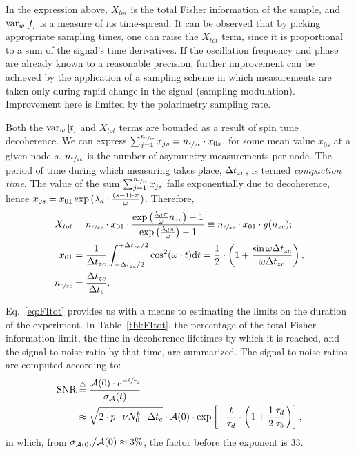 \documentclass{jacow}
\begin{document}
In the expression above, $X_{tot}$ is the total Fisher information of the sample, and $\var[w]{t}$ is a measure of its time-spread. It can be observed that by picking appropriate sampling times, one can raise the $X_{tot}$ term, since it is proportional to a sum of the signal's time derivatives. If the oscillation frequency and phase are already known to a reasonable precision, further improvement can be achieved by the application of a sampling scheme in which measurements are taken only during rapid change in the signal (sampling modulation). Improvement here is limited by the polarimetry sampling rate.

Both the $\var[w]{t}$ and $X_{tot}$ terms are bounded as a result of spin tune decoherence. We can express $\sum_{j=1}^{{n_{\sfrac{\epsilon}{zc}}}} x_{js} = {n_{\sfrac{\epsilon}{zc}}} \cdot x_{0s}$, for some mean value $x_{0s}$ at a given node $s$. ${n_{\sfrac{\epsilon}{zc}}}$ is the number of asymmetry measurements per node. The period of time during which measuring takes place, $\Delta t_{zc}$, is termed \textit{compaction time}. The value of the sum $\sum_{j=1}^{{n_{\sfrac{\epsilon}{zc}}}} x_{js}$ falls exponentially due to decoherence, hence $x_{0s} = x_{01}\exp{(\lambda_d\cdot \frac{(s-1)\cdot\pi}{\omega})}$. Therefore,
\begin{align}
	X_{tot} & = \Nmnd\cdot x_{01} \cdot \frac{\exp{\bkt{\frac{\lamd\pi}{\omega}\Nnd}}-1}{\exp{\bkt{\frac{\lamd\pi}{\omega}}}-1} 
	\equiv \Nmnd \cdot x_{01}\cdot g(\Nnd); \label{eq:FItot}\\
	x_{01}  & = \frac{1}{\dtnd}\int_{-\dtnd/2}^{+\dtnd/2}\cos^2(\omega\cdot t)\td t = \frac12\cdot \bkt{1 + \frac{\sin\omega\dtnd}{\omega\dtnd}},                                    \label{eq:MeanFIZC}   \\
	\Nmnd   & = \frac{\dtnd}{\dtm}. \label{eq:NumMeasNode}
\end{align}

Eq.~\eqref{eq:FItot} provides us with a means to estimating the limits on the duration of the experiment. In Table~\ref{tbl:FItot}, the percentage of the total Fisher information limit, the time in decoherence lifetimes by which it is reached, and the signal-to-noise ratio by that time, are summarized. The signal-to-noise ratios are computed according to:
\begin{align}
\SNR &\deq \frac{\Asym(0)\cdot e^{-\sfrac{t}{\LTd}}}{\SD{\Asym}(t)} \notag\\
	 &\approx \sqrt{2\cdot p\cdot\nu N_0^b\cdot \dtc}\cdot \Asym(0)\cdot \exp\bkt*{-\frac{t}{\LTd}\cdot\bkt{1+\frac12\frac{\LTd}{\LTb}}},\label{eq:TauRatioSNR}
\end{align}
in which, from $\SD{\Asym(0)}/\Asym(0) \approx 3\%$, the factor before the exponent is 33.
\end{document}
